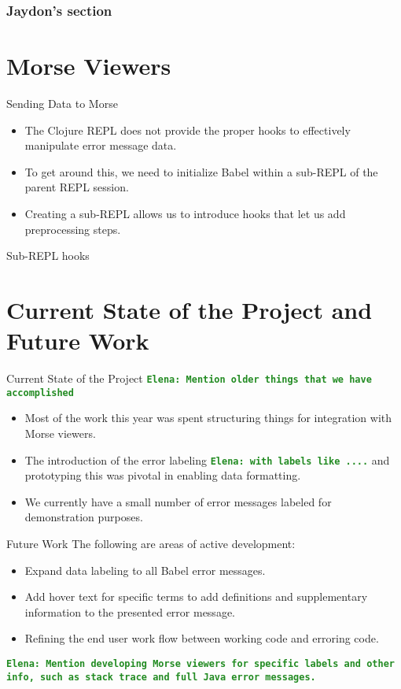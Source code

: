 \documentclass{beamer}
\newcommand{\comment}[1]{{\bf \tt  {#1}}}
\newcommand{\emcomment}[1]{\textcolor{ForestGreen}{\comment{Elena: {#1}}}}
\begin{document}
\begin{frame}
\frametitle{Jaydon's section}

\end{frame}

\section{Morse Viewers}

\begin{frame}{Sending Data to Morse}
  \begin{itemize}
    \item<1-> The Clojure REPL does not provide the proper hooks to effectively manipulate error message data.
    \item<2-> To get around this, we need to initialize Babel within a sub-REPL of the parent REPL session.
    \item<3-> Creating a sub-REPL allows us to introduce hooks that let us add preprocessing steps.
  \end{itemize}
\end{frame}

\begin{frame}{Sub-REPL hooks}

\end{frame}

\section{Current State of the Project and Future Work}
\begin{frame}{Current State of the Project}
\emcomment{Mention older things that we have accomplished}
  \begin{itemize}
    \item<1-> Most of the work this year was spent structuring things for integration with Morse viewers.
    \item<2-> The introduction of the error labeling \emcomment{with labels like ....} and prototyping this was pivotal in enabling data formatting.
    \item<3-> We currently have a small number of error messages labeled for demonstration purposes.
  \end{itemize}
\end{frame}

\begin{frame}{Future Work}
  The following are areas of active development:
  \begin{itemize}
    \item<1-> Expand data labeling to all Babel error messages.
    \item<2-> Add hover text for specific terms to add definitions and supplementary information to the presented error message.
    \item<3-> Refining the end user work flow between working code and erroring code.
  \end{itemize}
\emcomment{Mention developing Morse viewers for specific labels and other info, such as stack trace and full Java error messages.}
  \end{frame}
\end{document}
